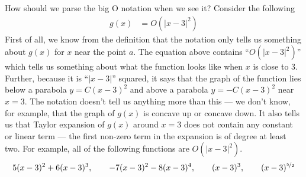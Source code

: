 How should we parse the big O notation when we see it? Consider
the following
\begin{align*}
  g(x) &= O( |x-3|^2 )
\end{align*}
First of all, we know from the definition that the notation
only tells us something about $g(x)$ for $x$ near the
point $a$. The equation above contains ``$O(|x-3|^2)$'' which
tells us something about what the function looks like when $x$
is close to $3$. Further, because it is ``$|x-3|$'' squared,
it says that the graph of the function lies below a parabola $y=C(x-3)^2$
and above a parabola $y=-C(x-3)^2$ near $x=3$. The notation doesn't
tell us anything more than this --- we don't know, for example,
that the graph of $g(x)$ is concave up or concave down. It also
tells us that Taylor expansion of $g(x)$ around $x=3$ does not
contain any constant or linear term --- the first non-zero term
in the expansion is of degree at least two.  For example, all of the
following functions are $O(|x-3|^2)$.
\begin{align*}
5(x-3)^2 + 6(x-3)^3,\qquad
-7(x-3)^2 - 8(x-3)^4,\qquad
(x-3)^3,\qquad
(x-3)^{\nicefrac{5}{2}}
\end{align*}


